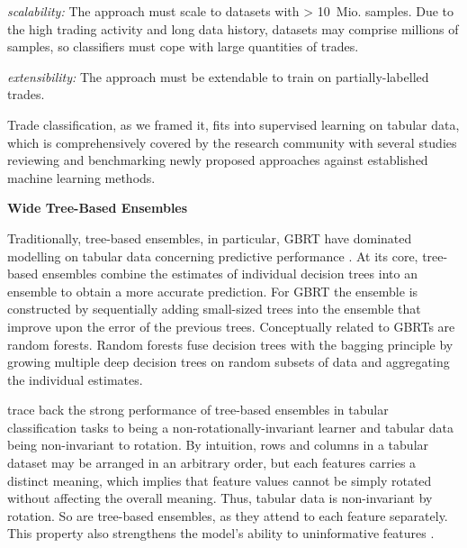 \emph{scalability:}  The approach must scale to datasets with > 10~Mio. samples. Due to the high trading activity and long data history, datasets may comprise millions of samples, so classifiers must cope with large quantities of trades.

\emph{extensibility:} The approach must be extendable to train on partially-labelled trades.

Trade classification, as we framed it, fits into supervised learning on tabular data, which is comprehensively covered by the research community with several studies reviewing and benchmarking newly proposed approaches against established machine learning methods.

\textbf{Wide Tree-Based Ensembles}

Traditionally, tree-based ensembles, in particular, \gls{GBRT} have dominated modelling on tabular data concerning predictive performance \autocites[][24--25]{grinsztajnWhyTreebasedModels2022}[][7]{kadraWelltunedSimpleNets2021}[][8]{gorishniyRevisitingDeepLearning2021}. At its core, tree-based ensembles combine the estimates of individual decision trees into an ensemble to obtain a more accurate prediction. For \gls{GBRT} \autocite[][9]{friedmanGreedyFunctionApproximation2001} the ensemble is constructed by sequentially adding small-sized trees into the ensemble that improve upon the error of the previous trees. Conceptually related to \glspl{GBRT} are random forests. Random forests \autocite[][6]{breimanRandomForests2001} fuse decision trees with the bagging principle \autocite[][123]{breimanBaggingPredictors1996} by growing multiple deep decision trees on random subsets of data and aggregating the individual estimates. 

\textcite[][7-9]{grinsztajnWhyTreebasedModels2022} trace back the strong performance of tree-based ensembles in tabular classification tasks to being a non-rotationally-invariant learner and tabular data being non-invariant to rotation. By intuition, rows and columns in a tabular dataset may be arranged in an arbitrary order, but each features carries a distinct meaning, which implies that feature values cannot be simply rotated without affecting the overall meaning. Thus, tabular data is non-invariant by rotation. So are tree-based ensembles, as they attend to each feature separately. This property also strengthens the model's ability to uninformative features \autocite[][8-9]{grinsztajnWhyTreebasedModels2022}.

